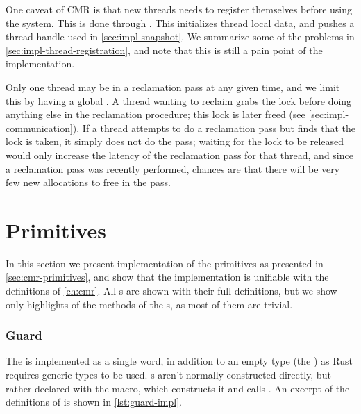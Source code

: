 One caveat of CMR is that new threads needs to register themselves before using the system. This is
done through . This initializes thread local data, and pushes a thread
handle used in \cref{sec:impl-snapshot}. We summarize some of the problems in
\cref{sec:impl-thread-registration}, and note that this is still a pain point of the
implementation.

Only one thread may be in a reclamation pass at any given time, and we limit this by having a
global . A thread wanting to reclaim grabs the lock before doing anything else
in the reclamation procedure; this lock is later freed (see
\cref{sec:impl-communication}). If a thread attempts to do a reclamation pass but finds that the
lock is taken, it simply does not do the pass; waiting for the lock to be released would only
increase the latency of the reclamation pass for that thread, and since a reclamation pass was
recently performed, chances are that there will be very few new allocations to free in the pass.



\section{Primitives\label{sec:impl-primitives}}

In this section we present implementation of the primitives as presented in
\cref{sec:cmr-primitives}, and show that the implementation is unifiable with the definitions of
\cref{ch:cmr}. All s are shown with their full definitions, but we show only
highlights of the methods of the s, as most of them are trivial.

\subsubsection{Guard}

The  is implemented as a single word, in addition to an empty type (the
) as Rust requires generic types to be used. s aren't normally
constructed directly, but rather declared with the  macro, which constructs it and
calls .  An excerpt of the definitions of  is shown in
\cref{lst:guard-impl}.

\begin{figure}

\end{figure}


